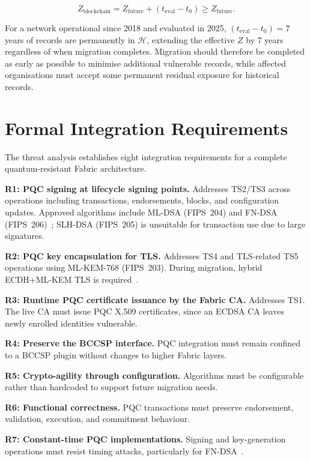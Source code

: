 \documentclass[conference]{IEEEtran}
\begin{document}
\begin{equation}
Z_{\mathrm{blockchain}} = Z_{\mathrm{future}} + (t_{\mathrm{eval}} - t_0)
\geq Z_{\mathrm{future}}.
\label{eq:mosca_blockchain}
\end{equation}

For a network operational since 2018 and evaluated in 2025,
$(t_{\mathrm{eval}}-t_0)=7$ years of records are permanently in $\mathcal{H}$,
extending the effective $Z$ by 7 years regardless of when migration completes.
Migration should therefore be completed as early as possible to minimise
additional vulnerable records, while affected organisations must accept some
permanent residual exposure for historical records.

\section{Formal Integration Requirements}
\label{sec:tm_requirements}
The threat analysis establishes eight integration requirements for a complete
quantum-resistant Fabric architecture.

\textbf{R1: PQC signing at lifecycle signing points.} Addresses TS2/TS3 across
operations including transactions, endorsements, blocks, and configuration
updates. Approved algorithms include ML-DSA (FIPS~204) and FN-DSA
(FIPS~206)~\cite{nist_fips204}; SLH-DSA (FIPS~205) is unsuitable
for transaction use due to large signatures.

\textbf{R2: PQC key encapsulation for TLS.} Addresses TS4 and TLS-related TS5
operations using ML-KEM-768 (FIPS~203). During migration, hybrid
ECDH+ML-KEM TLS is required~\cite{ietf_hybrid_tls}.

\textbf{R3: Runtime PQC certificate issuance by the Fabric CA.} Addresses TS1.
The live CA must issue PQC X.509 certificates, since an ECDSA CA leaves newly
enrolled identities vulnerable.

\textbf{R4: Preserve the BCCSP interface.} PQC integration must remain confined
to a BCCSP plugin without changes to higher Fabric layers.

\textbf{R5: Crypto-agility through configuration.} Algorithms must be
configurable rather than hardcoded to support future migration needs.

\textbf{R6: Functional correctness.} PQC transactions must preserve endorsement,
validation, execution, and commitment behaviour.

\textbf{R7: Constant-time PQC implementations.} Signing and key-generation
operations must resist timing attacks, particularly for
FN-DSA~\cite{pessl2019}.
\end{document}
